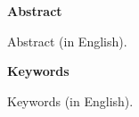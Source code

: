 
\cleardoublepage

\thispagestyle{empty}

\begin{center}

{\bf \Huge Abstract}

  \end{center}
\vspace{1cm}

Abstract (in English).

\vspace{1cm}


\begin{center}

{\bf \Large Keywords}

   \end{center}

   \vspace{0.5cm}
   
Keywords (in English).

   


